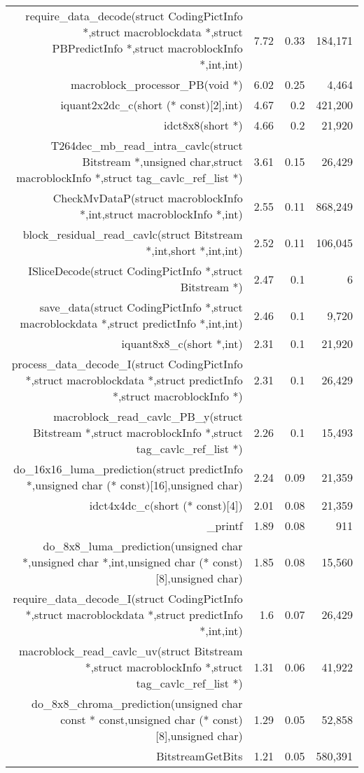 \begin{table}[htbp]
\begin{tabular}{rrrr}
    require\_data\_decode(struct CodingPictInfo *,struct macroblockdata *,struct PBPredictInfo *,struct macroblockInfo *,int,int) & 7.72  & 0.33  & 184,171 \\
    macroblock\_processor\_PB(void *) & 6.02  & 0.25  & 4,464 \\
    iquant2x2dc\_c(short (* const)[2],int) & 4.67  & 0.2   & 421,200 \\
    idct8x8(short *) & 4.66  & 0.2   & 21,920 \\
    T264dec\_mb\_read\_intra\_cavlc(struct Bitstream *,unsigned char,struct macroblockInfo *,struct tag\_cavlc\_ref\_list *) & 3.61  & 0.15  & 26,429 \\
    CheckMvDataP(struct macroblockInfo *,int,struct macroblockInfo *,int) & 2.55  & 0.11  & 868,249 \\
    block\_residual\_read\_cavlc(struct Bitstream *,int,short *,int,int) & 2.52  & 0.11  & 106,045 \\
    ISliceDecode(struct CodingPictInfo *,struct Bitstream *) & 2.47  & 0.1   & 6 \\
    save\_data(struct CodingPictInfo *,struct macroblockdata *,struct predictInfo *,int,int) & 2.46  & 0.1   & 9,720 \\
    iquant8x8\_c(short *,int) & 2.31  & 0.1   & 21,920 \\
    process\_data\_decode\_I(struct CodingPictInfo *,struct macroblockdata *,struct predictInfo *,struct macroblockInfo *) & 2.31  & 0.1   & 26,429 \\
    macroblock\_read\_cavlc\_PB\_y(struct Bitstream *,struct macroblockInfo *,struct tag\_cavlc\_ref\_list *) & 2.26  & 0.1   & 15,493 \\
    do\_16x16\_luma\_prediction(struct predictInfo *,unsigned char (* const)[16],unsigned char) & 2.24  & 0.09  & 21,359 \\
    idct4x4dc\_c(short (* const)[4]) & 2.01  & 0.08  & 21,359 \\
    \_printf & 1.89  & 0.08  & 911 \\
    do\_8x8\_luma\_prediction(unsigned char *,unsigned char *,int,unsigned char (* const)[8],unsigned char) & 1.85  & 0.08  & 15,560 \\
    require\_data\_decode\_I(struct CodingPictInfo *,struct macroblockdata *,struct predictInfo *,int,int) & 1.6   & 0.07  & 26,429 \\
    macroblock\_read\_cavlc\_uv(struct Bitstream *,struct macroblockInfo *,struct tag\_cavlc\_ref\_list *) & 1.31  & 0.06  & 41,922 \\
    do\_8x8\_chroma\_prediction(unsigned char const * const,unsigned char (* const)[8],unsigned char) & 1.29  & 0.05  & 52,858 \\
    BitstreamGetBits & 1.21  & 0.05  & 580,391 \\
    \bottomrule
    \end{tabular}
  \label{tab:addlabel}
\end{table}
